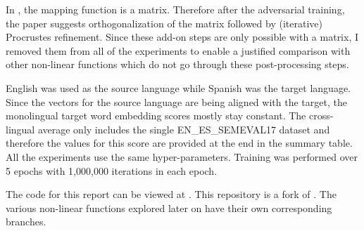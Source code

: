 \documentclass[11pt]{article}
\begin{document}
In \cite{conneau2017word}, the mapping function is a matrix. Therefore after the adversarial training, the paper suggests orthogonalization of the matrix followed by (iterative) Procrustes refinement. Since these add-on steps are only possible with a matrix, I removed them from all of the experiments to enable a justified comparison with other non-linear functions which do not go through these post-processing steps.

English was used as the source language while Spanish was the target language. Since the vectors for the source language are being aligned with the target, the monolingual target word embedding scores mostly stay constant. The cross-lingual average only includes the single EN\_ES\_SEMEVAL17 dataset and therefore the values for this score are provided at the end in the summary table. All the experiments use the same hyper-parameters. Training was performed over 5 epochs with 1,000,000 iterations in each epoch.

The code for this report can be viewed at \cite{muserepomine}. This repository is a fork of \cite{muserepo}. The various non-linear functions explored later on have their own corresponding branches.
\end{document}
